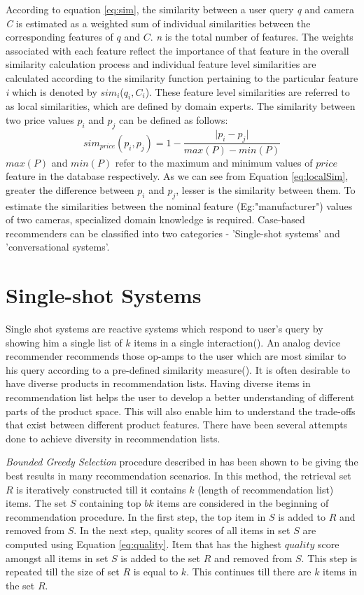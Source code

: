 According to equation \ref{eq:sim}, the similarity between a user query \textit{q} and camera \textit{C} is estimated 
as a weighted sum of individual similarities between the corresponding features of $q$ and $C$. 
\textit{n} is the total number of features.
The weights associated with each feature reflect the importance of that feature in the overall similarity calculation process and individual feature level similarities are calculated according to the similarity function pertaining to the particular feature \textit{i} which is denoted by $sim_i$($q_i, C_i$).
These feature level similarities are referred to as local similarities, which are defined by domain experts. 
The similarity between two price values $p_i$ and $p_j$ can be defined as follows:
\begin{equation}
\label{eq:localSim}
sim_{price}(p_i, p_j) = 1 - \frac{\lvert p_i - p_j \rvert}{max(P) - min(P)}
\end{equation}
$max(P)$ and $min(P)$ refer to the maximum and minimum values of $price$ feature in the database respectively.
As we can see from Equation \ref{eq:localSim}, greater the difference between $p_i$ and $p_j$, lesser is the similarity between them.
To estimate the similarities between the nominal feature (Eg:"manufacturer") values of two cameras, specialized domain knowledge is required.
Case-based recommenders can be classified into two categories - 'Single-shot systems' and 'conversational systems'.


\section{Single-shot Systems}
Single shot systems are reactive systems which respond to user's query by showing him a single list of $k$ items in a single interaction(\cite{smyth2007}).
An analog device recommender recommends those op-amps to the user which are most similar to his query according to a pre-defined similarity measure(\cite{wilke98}).
It is often desirable to have diverse products in recommendation lists.
Having diverse items in recommendation list helps the user to develop a better understanding of different parts of the product space.
This will also enable him to understand the trade-offs that exist between different product features.
There have been several attempts done to achieve diversity in recommendation lists.

\textit{Bounded Greedy Selection} procedure described in \cite{boundedGreedy} has been shown to be giving the best results in many recommendation scenarios. 
In this method, the retrieval set $R$ is iteratively constructed till it contains $k$ (length of recommendation list) items.
The set $S$ containing top $bk$ items are considered in the beginning of recommendation procedure. 
In the first step, the top item in $S$ is added to $R$ and removed from $S$.
In the next step, quality scores of all items in set $S$ are computed using Equation \ref{eq:quality}.
Item that has the highest $quality$ score amongst all items in set $S$ is added to the set $R$ and removed from $S$. 
This step is repeated till the size of set $R$ is equal to $k$.
This continues till there are $k$ items in the set $R$.

